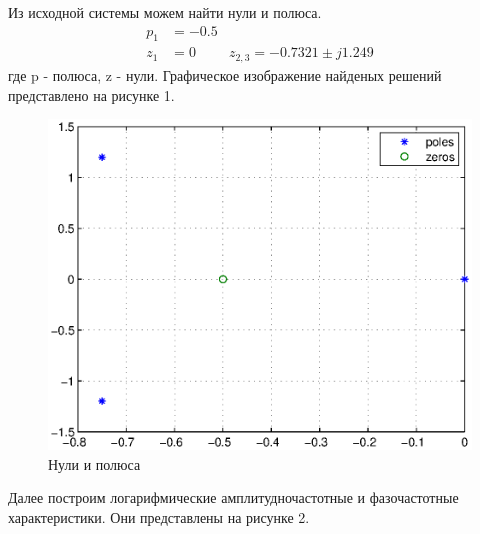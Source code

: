 \documentclass[a4paper, 12pt]{article}
\begin{document}
\par 
Из исходной системы можем найти нули и полюса.
    \begin{align*}
        p_1 & = -0.5 \\
        z_1 & = 0 & z_{2, 3} = -0.7321 \pm j1.249
    \end{align*}
    где p - полюса, z - нули. Графическое изображение найденых решений представлено на рисунке 1.
    
    \begin{figure} [h!]
        \centering
		\includegraphics[scale=0.9]{image/pole1.eps}
        \caption{Нули и полюса}
    \end{figure}

\par 
Далее построим логарифмические амплитудночастотные и фазочастотные характеристики. Они представлены на рисунке 2.
\end{document}
